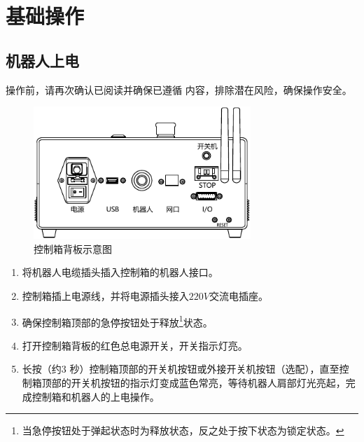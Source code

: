 \chapter{基础操作}
\label{cha:基础操作}

\section{机器人上电}

操作前，请再次确认已阅读并确保已遵循 内容，排除潜在风险，确保操作安全。

\begin{figure}[hb]
    \centering
    \includegraphics[height=5cm]{line_graphs/robot_control_box_back.pdf}
    \caption{控制箱背板示意图}
    \label{fig:控制箱背板示意图}
\end{figure}

\begin{enumerate}
\item 将机器人电缆插头插入控制箱的机器人接口。
\item 控制箱插上电源线，并将电源插头接入$\!220 \unit{V}\!$交流电插座。
\item 确保控制箱顶部的急停按钮处于释放\footnote{当急停按钮处于弹起状态时为释放状态，反之处于按下状态为锁定状态。}状态。
\item 打开控制箱背板的红色总电源开关，开关指示灯亮。
\item 长按（约3 秒）控制箱顶部的开关机按钮或外接开关机按钮（选配），直至控制箱顶部的开关机按钮的指示灯变成蓝色常亮，等待机器人肩部灯光亮起，完成控制箱和机器人的上电操作。
\end{enumerate}



